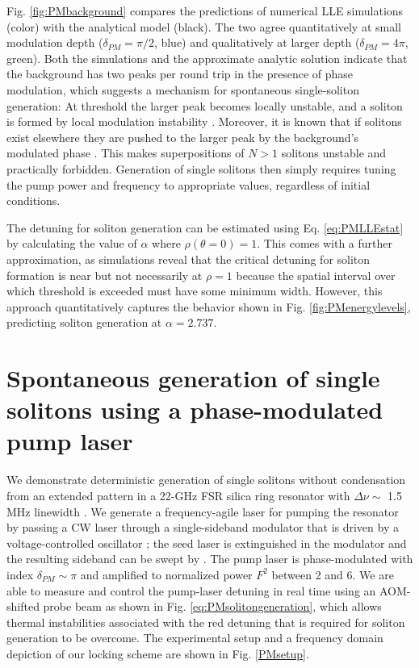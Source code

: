 Fig. \ref{fig:PMbackground} compares the predictions of numerical LLE simulations (color) with the analytical model (black). The two agree quantitatively at small modulation depth ($\delta_{PM}=\pi/2$, blue) and qualitatively at larger depth ($\delta_{PM}=4\pi$, green). Both the simulations and the approximate analytic solution indicate that the background has two peaks per round trip in the presence of phase modulation, which suggests a mechanism for spontaneous single-soliton generation: At threshold the larger peak becomes locally unstable, and a soliton is formed by local modulation instability \cite{Ceoldo2016,Wang2018}. Moreover, it is known that if solitons exist elsewhere they are pushed to the larger peak by the background’s modulated phase \cite{Jang2015a}. This makes superpositions of $N>1$ solitons unstable and practically forbidden. Generation of single solitons then simply requires tuning the pump power and frequency to appropriate values, regardless of initial conditions. 

The detuning for soliton generation can be estimated using Eq. \ref{eq:PMLLEstat} by calculating the value of $\alpha$ where $\rho(\theta=0)=1$. This comes with a further approximation, as simulations reveal that the critical detuning for soliton formation is near but not necessarily at $\rho=1$ because the spatial interval over which threshold is exceeded must have some minimum width. However, this approach quantitatively captures the behavior shown in Fig. \ref{fig:PMenergylevels}, predicting soliton generation at $\alpha=2.737$.

\section{Spontaneous generation of single solitons using a phase-modulated pump laser}


We demonstrate deterministic generation of single solitons without condensation from an extended pattern in a 22-GHz FSR silica ring resonator with $\Delta\nu\sim$ 1.5 MHz linewidth \cite{Lee2012}. We generate a frequency-agile laser for pumping the resonator by passing a CW laser through a single-sideband modulator that is driven by a voltage-controlled oscillator \cite{Stone2017}; the seed laser is extinguished in the modulator and the resulting sideband can be swept by . The pump laser is phase-modulated with index $\delta_{PM}\sim\pi$ and amplified to normalized power $F^2$ between 2 and 6. We are able to measure and control the pump-laser detuning in real time using an AOM-shifted probe beam as shown in Fig. \ref{eq:PMsolitongeneration}, which allows thermal instabilities associated with the red detuning that is required for soliton generation to be overcome. The experimental setup and a frequency domain depiction of our locking scheme are shown in Fig. \ref{PMsetup}. 

